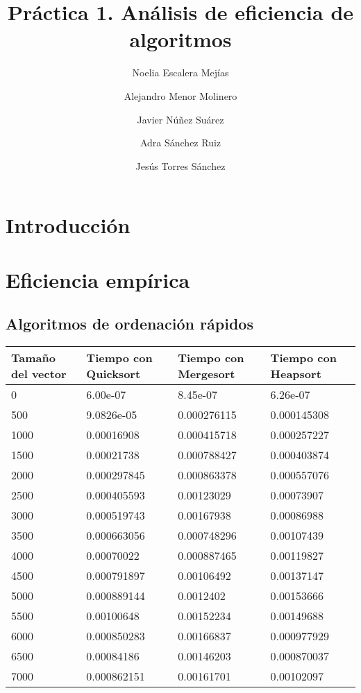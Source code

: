 \documentclass{article}
\title{Práctica 1. Análisis de eficiencia de algoritmos}
\author{Noelia Escalera Mejías\\
		\and Alejandro Menor Molinero\\
		\and Javier Núñez Suárez\\
		\and Adra Sánchez Ruiz
		\and Jesús Torres Sánchez}
\begin{document}
	\maketitle
	\section{Introducción}
	\section{Eficiencia empírica}
	\subsection{Algoritmos de ordenación rápidos}
\begin{table}[]
	\begin{tabular}{|l|l|l|l|}
		\hline
		Tamaño del vector & Tiempo con Quicksort & Tiempo con Mergesort & Tiempo con Heapsort \\ \hline
		0	   &  6.00e-07	    &   8.45e-07	 &  6.26e-07      \\ \hline
		500	   &  9.0826e-05    & 	0.000276115	 &  0.000145308  \\ \hline
		1000   &  0.00016908    & 	0.000415718	 &  0.000257227  \\ \hline
		1500   &  0.00021738    & 	0.000788427	 &  0.000403874  \\ \hline
		2000   &  0.000297845   & 	0.000863378	 &  0.000557076  \\ \hline
		2500   &  0.000405593   & 	0.00123029	 &  0.00073907  \\ \hline
		3000   &  0.000519743   & 	0.00167938	 &  0.00086988  \\ \hline
		3500   &  0.000663056   & 	0.000748296	 &  0.00107439  \\ \hline
		4000   &  0.00070022    & 	0.000887465	 &  0.00119827  \\ \hline
		4500   &  0.000791897   & 	0.00106492	 &  0.00137147  \\ \hline
		5000   &  0.000889144   & 	0.0012402	 &  0.00153666  \\ \hline
		5500   &  0.00100648    & 	0.00152234	 &  0.00149688  \\ \hline
		6000   &  0.000850283   & 	0.00166837	 &  0.000977929  \\ \hline
		6500   &  0.00084186    & 	0.00146203	 &  0.000870037  \\ \hline
		7000   &  0.000862151   & 	0.00161701	 &  0.00102097  \\ \hline

\end{tabular}
\end{table}
\end{document}
